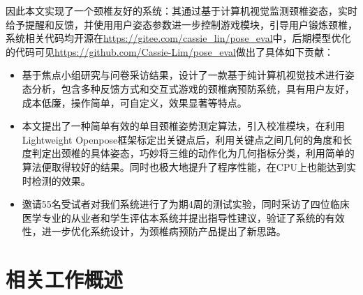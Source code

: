 \documentclass[12pt,a4paper]{article}%
\begin{document}
因此本文实现了一个颈椎友好的系统：其通过基于计算机视觉监测颈椎姿态，实时给予提醒和反馈，并使用用户姿态参数进一步控制游戏模块，引导用户锻炼颈椎，系统相关代码均开源在\href{https://gitee.com/cassie\_lin/pose\_eval}{https://gitee.com/cassie\_lin/pose\_eval}中，后期模型优化的代码可见\href{https://github.com/Cassie-Lim/pose\_eval}{https://github.com/Cassie-Lim/pose\_eval}做出了具体如下贡献：
\begin{itemize}
  
\item 基于焦点小组研究与问卷采访结果，设计了一款基于纯计算机视觉技术进行姿态分析，包含多种反馈方式和交互式游戏的颈椎病预防系统，具有用户友好，成本低廉，操作简单，可自定义，效果显著等特点。

\item 本文提出了一种简单有效的单目颈椎姿势测定算法，引入校准模块，在利用Lightweight Openpose框架标定出关键点后，利用关键点之间几何的角度和长度判定出颈椎的具体姿态，巧妙将三维的动作化为几何指标分类，利用简单的算法便取得较好的结果。同时也极大地提升了程序性能，在CPU上也能达到实时检测的效果。
  
\item 邀请55名受试者对我们系统进行了为期4周的测试实验，同时采访了四位临床医学专业的从业者和学生评估本系统并提出指导性建议，验证了系统的有效性，进一步优化系统设计，为颈椎病预防产品提出了新思路。

\end{itemize}


\section{相关工作概述}
\end{document}
